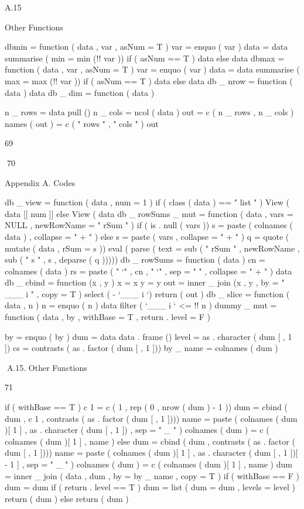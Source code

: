 A.15

Other Functions

dbmin = function ( data , var , asNum = T ) {
var = enquo ( var )
data = data %
summarise ( min = min (!! var ))
if ( asNum == T ) {
data %
} else {
data
}
}
dbmax = function ( data , var , asNum = T ) {
var = enquo ( var )
data = data %
summarise ( max = max (!! var ))
if ( asNum == T ) {
data %
} else {
data
}
}
db _ nrow = function ( data ) {
data %
}
db _ dim = function ( data ) {
n _ rows = data %
pull ()
n _ cols = ncol ( data )
out = c ( n _ rows , n _ cols )
names ( out ) = c ( " rows " , " cols " )
out

69

70

Appendix A. Codes

}
db _ view = function ( data , num = 1 ) {
if ( class ( data ) == " list " ) {
View ( data [[ num ]] %
} else {
View ( data %
}
}
db _ rowSums _ mut = function ( data , vars = NULL ,
newRowName = " rSum " ) {
if ( is . null ( vars )) {
s = paste ( colnames ( data ) , collapse = " + " )
} else {
s = paste ( vars , collapse = " + " )
}
q = quote ( mutate ( data , rSum = s ))
eval ( parse ( text = sub ( " rSum " , newRowName ,
sub ( " s " , s , deparse ( q )))))
}
db _ rowSums = function ( data ) {
cn = colnames ( data )
rs = paste ( " ‘" , cn , " ‘" , sep = " " , collapse = " + " )
data %
}
db _ cbind = function (x , y ) {
x = x %
y = y %
out = inner _ join (x , y , by = " ___ i " , copy = T ) %
select ( - ‘___ i ‘)
return ( out )
}
db _ slice = function ( data , n ) {
n = enquo ( n )
data %
filter ( ‘___ i ‘ <= !! n ) %
}
dummy _ mut = function ( data , by , withBase = T ,
return . level = F ) {
by = enquo ( by )
dum = data %
data . frame () %
level = as . character ( dum [ , 1 ])
cs = contrasts ( as . factor ( dum [ , 1 ]))
by _ name = colnames ( dum )

A.15. Other Functions

71

if ( withBase == T ) {
c 1 = c ( 1 , rep ( 0 , nrow ( dum ) - 1 ))
dum = cbind ( dum , c 1 , contrasts ( as . factor ( dum [ ,
1 ])))
name = paste ( colnames ( dum )[ 1 ] , as . character ( dum [ ,
1 ]) , sep = " _ " )
colnames ( dum ) = c ( colnames ( dum )[ 1 ] , name )
} else {
dum = cbind ( dum , contrasts ( as . factor ( dum [ ,
1 ])))
name = paste ( colnames ( dum )[ 1 ] , as . character ( dum [ ,
1 ])[ - 1 ] , sep = " _ " )
colnames ( dum ) = c ( colnames ( dum )[ 1 ] , name )
}
dum = inner _ join ( data , dum , by = by _ name ,
copy = T )
if ( withBase == F ) {
dum = dum %
}
if ( return . level == T ) {
dum = list ( dum = dum , levels = level )
return ( dum )
} else {
return ( dum )
}
}
